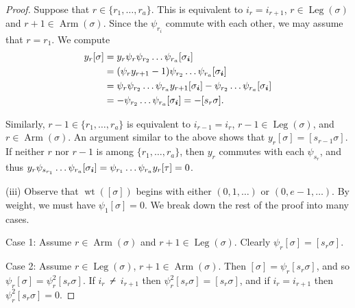 \documentclass[twoside,11pt,reqno,letter]{amsart}
\numberwithin{equation}{section}
\theoremstyle{definition}  %
\def\bi{\text{\boldmath$i$}}
\newcommand{\Arm}{\operatorname{Arm}}
\newcommand{\Leg}{\operatorname{Leg}}
\newcommand{\0}{{\bar 0}}
\newcommand{\1}{{\bar 1}}
\newcommand{\si}{\sigma}
\def\nslash{\:\notslash\:}
\def\wt{{\operatorname{wt}}}
\begin{document}
{\begin{proof}
    Suppose that $r \in \{r_1, \dots, r_a\}$. This is equivalent to $i_r = i_{r+1}$, $r \in \Leg(\si)$ and $r+1 \in \Arm(\si)$. Since the $\psi_{r_i}$ commute with each other, we may assume that $r = r_1$. We compute
    \begin{align*}
         y_r [\si] &= y_r \psi_r \psi_{r_2} \dots \psi_{r_a} [\si_\bi]\\
               &= (\psi_r y_{r+1} - 1) \psi_{r_2} \dots \psi_{r_a} [\si_\bi]\\
               &= \psi_r \psi_{r_2} \dots \psi_{r_a} y_{r+1} [\si_\bi] - \psi_{r_2} \dots \psi_{r_a} [\si_\bi]\\
               &= -\psi_{r_2} \dots \psi_{r_a} [\si_\bi] = -[s_r \si].
    \end{align*}

    Similarly, $r-1 \in \{r_1, \dots, r_a\}$ is equivalent to $i_{r-1} = i_r$, $r-1 \in \Leg(\si)$, and $r \in \Arm(\si)$. An argument similar to the above shows that $y_r [\si] = [s_{r-1} \si]$.
    If neither $r$ nor $r-1$ is among $\{r_1, \dots, r_a\}$, then $y_r$ commutes with each $\psi_{s_r}$, and thus $y_r \psi_{s_{r_1}} \dots \psi_{r_a} [\si_\bi] = \psi_{r_1} \dots \psi_{r_a} y_r [\tau] = 0$.

  (iii) Observe that $\wt([\si])$ begins with either $(0,1,\dots)$ or $(0,e-1,\dots)$. By weight, we must have $\psi_1 [\si] = 0$. We break down the rest of the proof into many cases.

  Case 1: Assume $r \in \Arm(\si)$ and $r+1 \in \Leg(\si)$. Clearly $\psi_r [\si] = [s_r \si]$.

  Case 2: Assume $r \in \Leg(\si)$, $r+1 \in \Arm(\si)$. Then $[\si] = \psi_r [s_r \si]$, and so $\psi_r [\si] = \psi_r^2 [s_r \si]$. If $i_r \nslash i_{r+1}$ then $\psi_r^2 [s_r \si] = [s_r \si]$, and if $i_r = i_{r+1}$ then $\psi_r^2 [s_r \si] = 0$.


\end{proof}}
\end{document}
